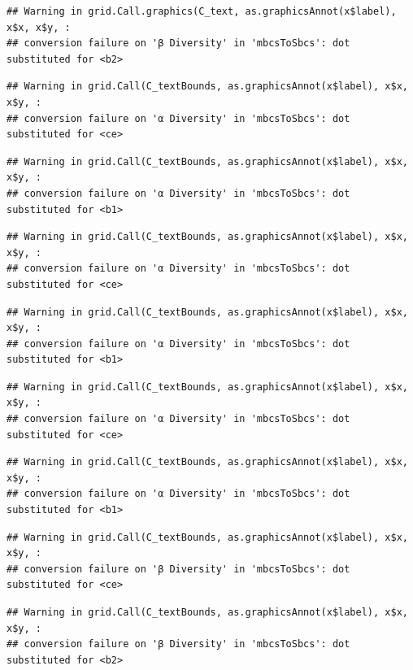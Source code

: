 \documentclass[
]{article}
\begin{document}
\begin{verbatim}
## Warning in grid.Call.graphics(C_text, as.graphicsAnnot(x$label), x$x, x$y, :
## conversion failure on 'β Diversity' in 'mbcsToSbcs': dot substituted for <b2>
\end{verbatim}

\begin{verbatim}
## Warning in grid.Call(C_textBounds, as.graphicsAnnot(x$label), x$x, x$y, :
## conversion failure on 'α Diversity' in 'mbcsToSbcs': dot substituted for <ce>
\end{verbatim}

\begin{verbatim}
## Warning in grid.Call(C_textBounds, as.graphicsAnnot(x$label), x$x, x$y, :
## conversion failure on 'α Diversity' in 'mbcsToSbcs': dot substituted for <b1>
\end{verbatim}

\begin{verbatim}
## Warning in grid.Call(C_textBounds, as.graphicsAnnot(x$label), x$x, x$y, :
## conversion failure on 'α Diversity' in 'mbcsToSbcs': dot substituted for <ce>
\end{verbatim}

\begin{verbatim}
## Warning in grid.Call(C_textBounds, as.graphicsAnnot(x$label), x$x, x$y, :
## conversion failure on 'α Diversity' in 'mbcsToSbcs': dot substituted for <b1>
\end{verbatim}

\begin{verbatim}
## Warning in grid.Call(C_textBounds, as.graphicsAnnot(x$label), x$x, x$y, :
## conversion failure on 'α Diversity' in 'mbcsToSbcs': dot substituted for <ce>
\end{verbatim}

\begin{verbatim}
## Warning in grid.Call(C_textBounds, as.graphicsAnnot(x$label), x$x, x$y, :
## conversion failure on 'α Diversity' in 'mbcsToSbcs': dot substituted for <b1>
\end{verbatim}

\begin{verbatim}
## Warning in grid.Call(C_textBounds, as.graphicsAnnot(x$label), x$x, x$y, :
## conversion failure on 'β Diversity' in 'mbcsToSbcs': dot substituted for <ce>
\end{verbatim}

\begin{verbatim}
## Warning in grid.Call(C_textBounds, as.graphicsAnnot(x$label), x$x, x$y, :
## conversion failure on 'β Diversity' in 'mbcsToSbcs': dot substituted for <b2>
\end{verbatim}
\end{document}
